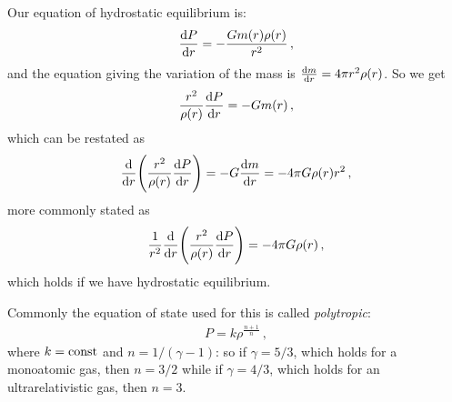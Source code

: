 \documentclass[main.tex]{subfiles}
\begin{document}
Our equation of hydrostatic equilibrium is:
%
\begin{align}
  \dv{P}{r} = - \frac{G m(r) \rho (r)}{r^2}
\,,
\end{align}
%
and the equation giving the variation of the mass is \(\dv{m}{r} = 4 \pi r^2 \rho (r)\).
So we get 
%
\begin{align}
  \frac{r^2}{\rho (r)} \dv{P}{r} = - G m(r)
\,,
\end{align}
%
which can be restated as 
%
\begin{align}
  \dv{}{r} \qty(\frac{r^2}{\rho (r)} \dv{P}{r}) = - G \dv{m}{r} = - 4 \pi G \rho (r) r^2
\,,
\end{align}
%
more commonly stated as 
%
\begin{align}
  \frac{1}{r^2} \dv{}{r} \qty(\frac{r^2}{\rho (r)} \dv{P}{r}) = -4 \pi G \rho (r)
\,,
\end{align}
%
which holds if we have hydrostatic equilibrium. 

Commonly the equation of state used for this is called \emph{polytropic}: 
%
\begin{align}
  P = k \rho^{\frac{n+1}{n}}
\,,
\end{align}
%
where \(k = \text{const}\) and \(n = 1/ (\gamma -1)\): so if \(\gamma = 5/3\), which holds for a monoatomic gas, then \(n = 3/2\) while if \(\gamma = 4/3\), which holds for an ultrarelativistic gas, then \(n = 3\). 
\end{document}
